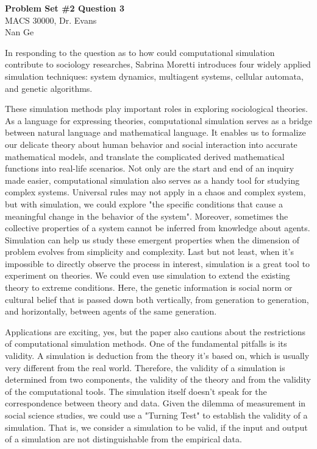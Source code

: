 \documentclass[letterpaper,12pt]{article}
\theoremstyle{definition}
\begin{document}
\begin{flushleft}
  \textbf{\large{Problem Set \#2 Question 3}} \\
  MACS 30000, Dr. Evans \\
  Nan Ge
\end{flushleft}

\vspace{5mm}

In responding to the question as to how could computational simulation contribute to sociology researches, Sabrina Moretti introduces four widely applied simulation techniques: system dynamics, multiagent systems, cellular automata, and genetic algorithms.

These simulation methods play important roles in exploring sociological theories. As a language for expressing theories, computational simulation serves as a bridge between natural language and mathematical language. It enables us to formalize our delicate theory about human behavior and social interaction into accurate mathematical models, and translate the complicated derived mathematical functions into real-life scenarios. Not only are the start and end of an inquiry made easier, computational simulation also serves as a handy tool for studying complex systems. Universal rules may not apply in a chaos and complex system, but with simulation, we could explore "the specific conditions that cause a meaningful change in the behavior of the system".  Moreover, sometimes the collective properties of a system cannot be inferred from knowledge about agents. Simulation can help us study these emergent properties when the dimension of problem evolves from simplicity and complexity. Last but not least, when it's impossible to directly observe the process in interest, simulation is a great tool to experiment on theories. We could even use simulation to extend the existing theory to extreme conditions. Here, the genetic information is social norm or cultural belief that is passed down both vertically, from generation to generation, and horizontally, between agents of the same generation.

Applications are exciting, yes, but the paper also cautions about the restrictions of computational simulation methods. One of the fundamental pitfalls is its validity. A simulation is deduction from the theory it's based on, which is usually very different from the real world. Therefore,  the validity of a simulation is determined from two components, the validity of the theory and from the validity of the computational tools. The simulation itself doesn't speak for the correspondence between theory and data. Given the dilemma of measurement in social science studies, we could use a "Turning Test" to establish the validity of a simulation. That is, we consider a simulation to be valid, if the input and output of a simulation are not distinguishable from the empirical data.
\end{document}
